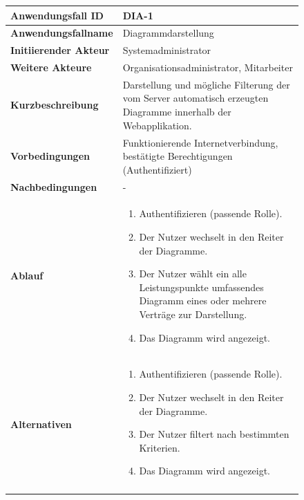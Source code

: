 \begin{figure}[h]
	\centering
	\begin{tabularx}{\textwidth}{ X | X }
		\textbf{Anwendungsfall ID} & DIA-1 \\ \hline
		\textbf{Anwendungsfallname} & Diagrammdarstellung \\ \hline
		\textbf{Initiierender Akteur} & Systemadministrator \\ \hline
		\textbf{Weitere Akteure} & Organisationsadministrator, Mitarbeiter \\ \hline
		\textbf{Kurzbeschreibung} & Darstellung und mögliche Filterung der vom Server automatisch erzeugten Diagramme innerhalb der Webapplikation.  \\ \hline
		\textbf{Vorbedingungen} & Funktionierende Internetverbindung, bestätigte Berechtigungen (Authentifiziert)  \\ \hline
		\textbf{Nachbedingungen} &  -  \\ \hline
		\textbf{Ablauf} &
		\begin{enumerate}
			\item Authentifizieren (passende Rolle).
			\item Der Nutzer wechselt in den Reiter der Diagramme.
			\item Der Nutzer wählt ein alle Leistungspunkte umfassendes Diagramm eines oder mehrere Verträge zur Darstellung.
			\item Das Diagramm wird angezeigt.
		\end{enumerate} \\ \hline
		\multirow{2}{*}{\textbf{Alternativen}} &
		\begin{enumerate}
			\item Authentifizieren (passende Rolle).
			\item Der Nutzer wechselt in den Reiter der Diagramme.
			\item Der Nutzer filtert nach bestimmten Kriterien.
			\item Das Diagramm wird angezeigt.
		\end{enumerate} \\\cline{2-2} &

\end{tabularx}
\end{figure}
